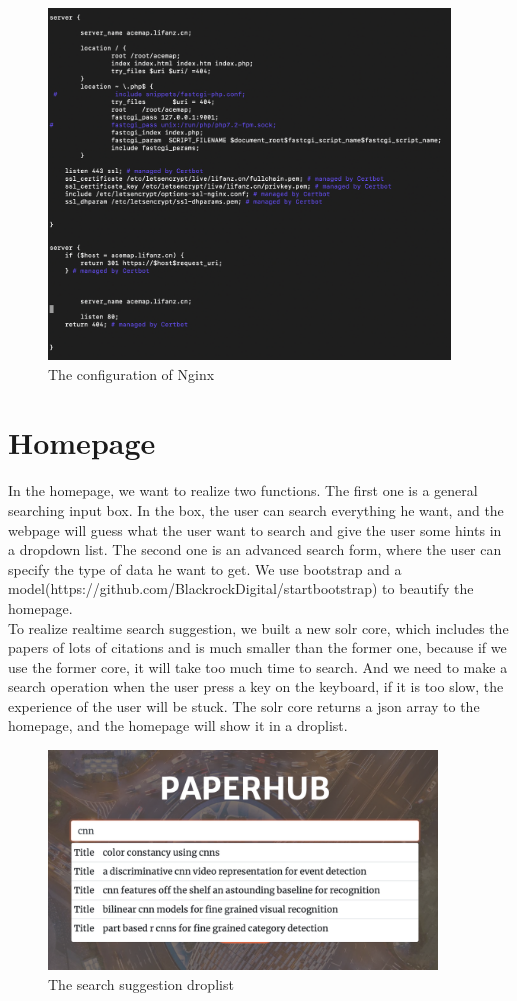 \documentclass{article}
\begin{document}
\begin{figure}[h]
\begin{center}
\includegraphics[width=0.95\textwidth]{zlf_2} %
\caption{The configuration of Nginx}
\end{center}
\end{figure}

\section{Homepage}
\hspace*{0.5cm}
In the homepage, we want to realize two functions. The first one is a general searching input box. In the box, the user
can search everything he want, and the webpage will guess what the user want to search and give the user some hints in a
dropdown list. The second one is an advanced search form, where the user can specify the type of data he want to get.
We use bootstrap and a model(https://github.com/BlackrockDigital/startbootstrap) to beautify the homepage.\\
To realize realtime search suggestion, we built a new solr core, which includes the papers of lots of citations and is much
smaller than the former one, because if we use the former core, it will take too much time to search. And we need to make
a search operation when the user press a key on the keyboard, if it is too slow, the experience of the user will be stuck.
The solr core returns a json array to the homepage, and the homepage will show it in a droplist.

\begin{figure}[h]
\begin{center}
\includegraphics[width=0.92\textwidth]{zlf_3} %
\caption{The search suggestion droplist}
\end{center}
\end{figure}
\end{document}
